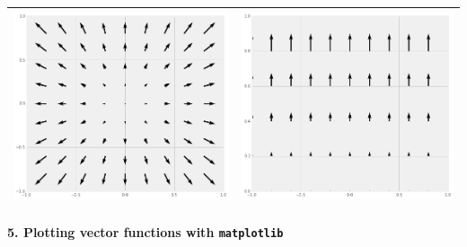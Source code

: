 \documentclass[
  letterpaperpaper,
]{article}
\begin{document}
\begin{longtable}[]{@{}cc@{}}
\includegraphics{./images/hw1/C.png} &
\includegraphics{./images/hw1/D.png}\tabularnewline
\bottomrule
\end{longtable}

\hypertarget{plotting-vector-functions-with-matplotlib}{%
\paragraph{\texorpdfstring{5. Plotting vector functions with
\texttt{matplotlib}}{5. Plotting vector functions with matplotlib}}\label{plotting-vector-functions-with-matplotlib}}
\end{document}

